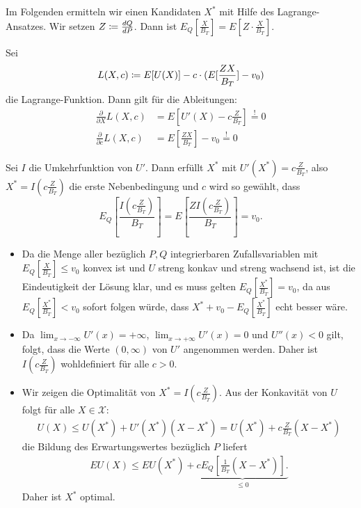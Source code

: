 \documentclass[a4paper,twoside,DIV15,BCOR12mm]{scrbook}
\newcommand{\cX}{\mathcal X}
\begin{document}
Im Folgenden ermitteln wir einen Kandidaten $X^*$ mit Hilfe des Lagrange-Ansatzes. Wir setzen $Z \da \frac{dQ}{dP}$. Dann ist $E_Q[\frac X{B_T}] = E[Z\cdot \frac{X}{B_T}]$.

Sei
\[
L(X,c) \da E[U(X)] - c\cdot (E[\frac{ZX}{B_T}] - v_0)
\]
die Lagrange-Funktion. Dann gilt für die Ableitungen:
\begin{align*}
\frac\partial{\partial X} L(X,c) &= E[U'(X) - c \frac Z{B_T}] \stackrel!= 0 \\
\frac\partial{\partial c} L(X,c) &= E[\frac{ZX}{B_T}] - v_0 \stackrel!= 0
\end{align*}

Sei $I$ die Umkehrfunktion von $U'$. Dann erfüllt $X^*$ mit $U'(X^*) = c \frac{Z}{B_T}$, also $X^* = I(c \frac{Z}{B_T})$ die erste Nebenbedingung und $c$ wird so gewählt, dass 
\[
E_Q[\frac{I(c\frac{Z}{B_T})}{B_T}] = E[\frac{Z I(c\frac{Z}{B_T})}{B_T}] = v_0.
\]

\begin{bemerkung}
\begin{itemize}
\item Da die Menge aller bezüglich $P,Q$ integrierbaren Zufallsvariablen mit $E_Q[\frac{X}{B_T}] \le v_0$ konvex ist und $U$ streng konkav und streng wachsend ist, ist die Eindeutigkeit der Lösung klar, und es muss gelten $E_Q[\frac{X^*}{B_T}]=v_0$, da aus $E_Q[\frac{X^*}{B_T}] < v_0$ sofort folgen würde, dass $X^* + v_0 - E_Q[\frac{X^*}{B_T}]$ echt besser wäre.
\item Da $\lim_{x\to-\infty}U'(x) = +\infty$, $\lim_{x\to +\infty}U'(x)=0$ und $U''(x) <0$ gilt, folgt, dass die Werte $(0,\infty)$ von $U'$ angenommen werden. Daher ist $I(c\frac{Z}{B_T})$ wohldefiniert für alle $c>0$.
\item Wir zeigen die Optimalität von $X^* = I(c\frac{Z}{B_T})$. Aus der Konkavität von $U$ folgt für alle $X\in\cX$:
\begin{align*}
U(X) \le U(X^*) + U'(X^*)(X-X^*) = U(X^*) + c\frac{Z}{B_T}(X-X^*)
\end{align*}
die Bildung des Erwartungswertes bezüglich $P$ liefert
\begin{align*}
EU(X) \le EU(X^*) + \underbrace{c E_Q[\frac{1}{B_T}(X-X^*)].}_{\le 0}
\end{align*}
Daher ist $X^*$ optimal.
\end{itemize}
\end{bemerkung}
\end{document}
